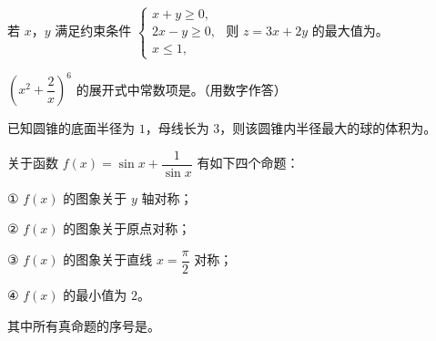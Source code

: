 \begin{question}
若 $x$，$y$ 满足约束条件 $\begin{cases}x+y\geqslant0,\\2x-y\geqslant0,\\x\leqslant1,\end{cases}$ 则 $z=3x+2y$ 的最大值为\gkblank{}。

\end{question}
\begin{question}
$\left(x^2+\dfrac2x\right)^6$ 的展开式中常数项是\gkblank{}。（用数字作答）

\end{question}
\begin{question}
已知圆锥的底面半径为 $1$，母线长为 $3$，则该圆锥内半径最大的球的体积为\gkblank{}。

\end{question}
\begin{question}
关于函数 $f(x)=\sin x+\dfrac1{\sin x}$ 有如下四个命题：

① $f(x)$ 的图象关于 $y$ 轴对称；

② $f(x)$ 的图象关于原点对称；

③ $f(x)$ 的图象关于直线 $x=\dfrac\pi2$ 对称；

④ $f(x)$ 的最小值为 $2$。

其中所有真命题的序号是\gkblank{}。

\end{question}

